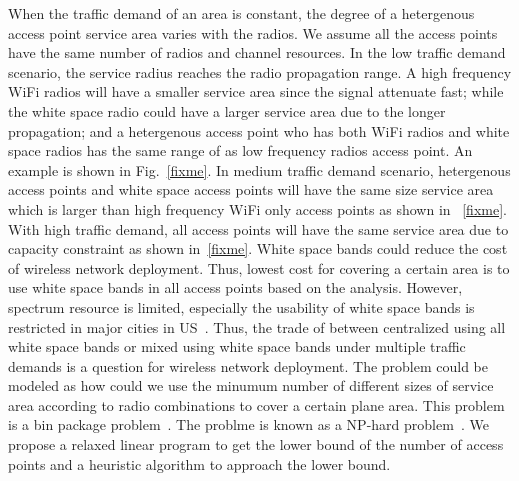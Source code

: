 When the traffic demand of an area is constant, the degree of a hetergenous access point service area 
varies with the radios. We assume all the access points have the same number of radios and channel 
resources.
In the low traffic demand scenario, the service radius reaches the radio propagation range.
A high frequency WiFi radios will have a smaller service area since the signal attenuate fast; while the white
space radio could have a larger service area due to the longer propagation; and a hetergenous access point who has
both WiFi radios and white space radios has the same range of as low frequency radios access point. An example is
shown in Fig.~\ref{fixme}.
In medium traffic demand scenario, hetergenous access points and white space access points will 
have the same size service area which is larger than high frequency WiFi only access points as shown in 
~\ref{fixme}.
With high traffic demand, all access points will have the same service area due to capacity constraint 
as shown in~\ref{fixme}. White space bands could reduce the cost of wireless network deployment. 
Thus, lowest cost for covering a certain area is to use white space bands in all access points 
based on the analysis. However, spectrum resource is limited, especially the usability
of white space bands is restricted in major cities in US~\cite{msdatabase}. 
Thus, the trade of between centralized using all white space bands or mixed using white space
bands under multiple traffic demands is a question for wireless network deployment. The problem
could be modeled as how could we use the minumum number of different sizes of service area according to 
radio combinations to cover a certain plane area. This problem is a bin package problem~\cite{fixme}.
The problme is known as a NP-hard problem~\cite{fixme}. We propose a relaxed linear program to 
get the lower bound of the number of access points and a heuristic algorithm to approach the 
lower bound.

%
%

